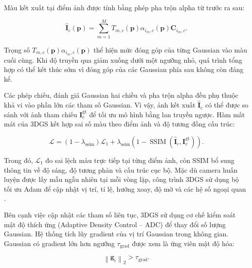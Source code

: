 Màu kết xuất tại điểm ảnh được tính bằng phép pha trộn alpha \cite{porter1984compositing} từ trước ra sau:

\begin{equation}
    \widehat{\mathbf{I}}_c(\mathbf{p})
    =
    \sum_{m=1}^{M}
    T_{m,c}(\mathbf{p})
    \alpha_{i_m,c}(\mathbf{p})
    \mathbf{C}_{i_m,c}.
    \label{eq:3dgs-alpha-blending}
\end{equation}

Trọng số $T_{m,c}(\mathbf{p})\alpha_{i_m,c}(\mathbf{p})$ thể hiện mức đóng góp của từng Gaussian vào màu cuối cùng. Khi độ truyền qua giảm xuống dưới một ngưỡng nhỏ, quá trình tổng hợp có thể kết thúc sớm vì đóng góp của các Gaussian phía sau không còn đáng kể.

Các phép chiếu, đánh giá Gaussian hai chiều và pha trộn alpha đều phụ thuộc khả vi vào phần lớn các tham số Gaussian. Vì vậy, ảnh kết xuất $\widehat{\mathbf{I}}_c$ có thể được so sánh với ảnh tham chiếu $\mathbf{I}^{\mathrm{gt}}_c$ để tối ưu mô hình bằng lan truyền ngược. Hàm mất mát của 3DGS kết hợp sai số màu theo điểm ảnh và độ tương đồng cấu trúc:

\begin{equation}
    \mathcal{L}
    =
    \left(
        1-\lambda_{\mathrm{ssim}}
    \right)
    \mathcal{L}_{1}
    +
    \lambda_{\mathrm{ssim}}
    \left(
        1-
        \operatorname{SSIM}
        \left(
            \widehat{\mathbf{I}}_c,
            \mathbf{I}^{\mathrm{gt}}_c
        \right)
    \right).
    \label{eq:3dgs-rendering-loss}
\end{equation}

Trong đó, $\mathcal{L}_{1}$ đo sai lệch màu trực tiếp tại từng điểm ảnh, còn SSIM bổ sung thông tin về độ sáng, độ tương phản và cấu trúc cục bộ. Mặc dù camera huấn luyện được lấy mẫu ngẫu nhiên tại mỗi vòng lặp, công trình 3DGS sử dụng bộ tối ưu Adam \cite{kingma2014adam} để cập nhật vị trí, tỉ lệ, hướng xoay, độ mờ và các hệ số ngoại quan \cite{kerbl2023gaussian}.

Bên cạnh việc cập nhật các tham số liên tục, 3DGS sử dụng cơ chế kiểm soát mật độ thích ứng (Adaptive Density Control -- ADC) để thay đổi số lượng Gaussian. Hệ thống tích lũy gradient của vị trí Gaussian trong không gian. Gaussian có gradient lớn hơn ngưỡng $\tau_{\mathrm{grad}}$ được xem là ứng viên mật độ hóa:

\begin{equation}
    \left\|
        \mathbf{g}_i
    \right\|_2
    >
    \tau_{\mathrm{grad}}.
    \label{eq:3dgs-densification-condition}
\end{equation}

